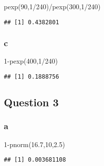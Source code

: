 \documentclass[
]{article}
\newenvironment{Shaded}{\begin{snugshade}}{\end{snugshade}}
\newcommand{\DecValTok}[1]{\textcolor[rgb]{0.00,0.00,0.81}{#1}}
\newcommand{\FloatTok}[1]{\textcolor[rgb]{0.00,0.00,0.81}{#1}}
\newcommand{\FunctionTok}[1]{\textcolor[rgb]{0.00,0.00,0.00}{#1}}
\newcommand{\NormalTok}[1]{#1}
\newcommand{\SpecialCharTok}[1]{\textcolor[rgb]{0.00,0.00,0.00}{#1}}
\begin{document}
\begin{Shaded}
\begin{Highlighting}[]
\FunctionTok{pexp}\NormalTok{(}\DecValTok{90}\NormalTok{,}\DecValTok{1}\SpecialCharTok{/}\DecValTok{240}\NormalTok{)}\SpecialCharTok{/}\FunctionTok{pexp}\NormalTok{(}\DecValTok{300}\NormalTok{,}\DecValTok{1}\SpecialCharTok{/}\DecValTok{240}\NormalTok{)}
\end{Highlighting}
\end{Shaded}

\begin{verbatim}
## [1] 0.4382801
\end{verbatim}

\hypertarget{c}{%
\subsubsection{c}\label{c}}

\begin{Shaded}
\begin{Highlighting}[]
\DecValTok{1}\SpecialCharTok{{-}}\FunctionTok{pexp}\NormalTok{(}\DecValTok{400}\NormalTok{,}\DecValTok{1}\SpecialCharTok{/}\DecValTok{240}\NormalTok{)}
\end{Highlighting}
\end{Shaded}

\begin{verbatim}
## [1] 0.1888756
\end{verbatim}

\hypertarget{question-3}{%
\subsection{Question 3}\label{question-3}}

\hypertarget{a-2}{%
\subsubsection{a}\label{a-2}}

\begin{Shaded}
\begin{Highlighting}[]
\DecValTok{1}\SpecialCharTok{{-}}\FunctionTok{pnorm}\NormalTok{(}\FloatTok{16.7}\NormalTok{,}\DecValTok{10}\NormalTok{,}\FloatTok{2.5}\NormalTok{)}
\end{Highlighting}
\end{Shaded}

\begin{verbatim}
## [1] 0.003681108
\end{verbatim}
\end{document}
